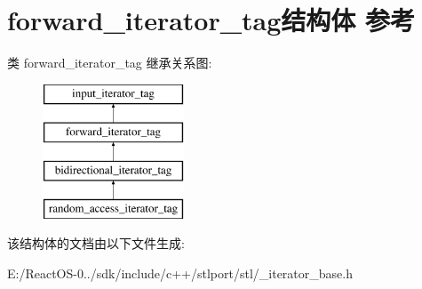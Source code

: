 \hypertarget{structforward__iterator__tag}{}\section{forward\+\_\+iterator\+\_\+tag结构体 参考}
\label{structforward__iterator__tag}
类 forward\+\_\+iterator\+\_\+tag 继承关系图\+:\begin{figure}[H]
\begin{center}
\leavevmode
\includegraphics[height=4.000000cm]{structforward__iterator__tag}
\end{center}
\end{figure}


该结构体的文档由以下文件生成\+:\begin{DoxyCompactItemize}
\item 
E\+:/\+React\+O\+S-\/0../sdk/include/c++/stlport/stl/\+\_\+iterator\+\_\+base.\+h\end{DoxyCompactItemize}
